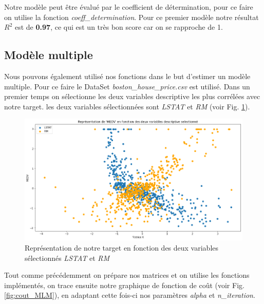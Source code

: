 \documentclass[french]{article}
\begin{document}
Notre modèle peut être évalué par le coefficient de détermination, pour ce faire on utilise la fonction \textit{coeff\_determination}. Pour ce premier modèle notre résultat $R^{2}$ est de \textbf{0.97}, ce qui est un très bon score car on se rapproche de 1.

\subsection{Modèle multiple}

Nous pouvons également utilisé nos fonctions dans le but d'estimer un modèle multiple. Pour ce faire le DataSet \textit{boston\_house\_price.csv} est utilisé. Dans un premier temps on sélectionne les deux variables descriptive les plus corrélées avec notre target. les deux variables sélectionnées sont \textit{LSTAT} et \textit{RM} (voir Fig. \ref{fig:boston_data}).\\

\begin{figure}[!htbp]
    \centering
    \includegraphics[width=\textwidth]{Rapport/images/data_MLM.png}
    \caption{Représentation de notre target en fonction des deux variables sélectionnés \textit{LSTAT} et \textit{RM}}
    \label{fig:boston_data}
\end{figure}

\noindent Tout comme précédemment on prépare nos matrices et on utilise les fonctions implémentés, on trace ensuite notre graphique de fonction de coût (voir Fig. \ref{fig:cout_MLM}), en adaptant cette fois-ci nos paramètres \textit{alpha} et \textit{n\_iteration}.\\
\end{document}
